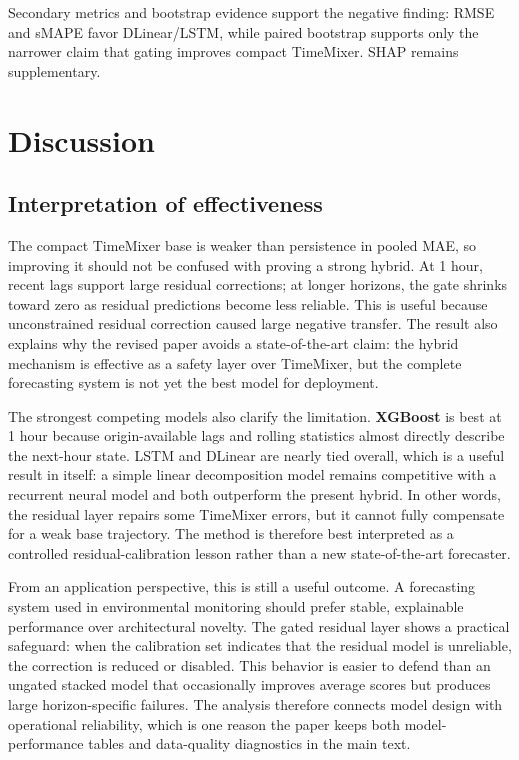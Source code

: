 \documentclass[sn-mathphys-num]{sn-jnl}
\begin{document}
Secondary metrics and bootstrap evidence support the negative finding: RMSE
and sMAPE favor DLinear/LSTM, while paired bootstrap supports only the narrower
claim that gating improves compact TimeMixer. SHAP remains supplementary.
\FloatBarrier

\section{Discussion}
\label{sec:discussion}



\subsection{Interpretation of effectiveness}
\label{sec:discussion-interpretation}

The compact TimeMixer base is weaker than persistence in pooled MAE, so
improving it should not be confused with proving a strong hybrid. At 1 hour,
recent lags support large residual corrections; at longer horizons, the gate
shrinks toward zero as residual predictions become less reliable. This is
useful because unconstrained residual correction caused large negative transfer.
The result also explains why the revised paper avoids a state-of-the-art claim:
the hybrid mechanism is effective as a safety layer over TimeMixer, but the
complete forecasting system is not yet the best model for deployment.

The strongest competing models also clarify the limitation. \textbf{XGBoost}
is best at 1 hour because origin-available lags and rolling statistics almost
directly describe the next-hour state. LSTM and DLinear are nearly tied overall,
which is a useful result in itself: a simple linear decomposition model remains
competitive with a recurrent neural model and both outperform the present
hybrid. In other words, the residual layer repairs some TimeMixer errors, but
it cannot fully compensate for a weak base trajectory. The method is therefore
best interpreted as a controlled residual-calibration lesson rather than a new
state-of-the-art forecaster.

From an application perspective, this is still a useful outcome. A forecasting
system used in environmental monitoring should prefer stable, explainable
performance over architectural novelty. The gated residual layer shows a
practical safeguard: when the calibration set indicates that the residual model
is unreliable, the correction is reduced or disabled. This behavior is easier
to defend than an ungated stacked model that occasionally improves average
scores but produces large horizon-specific failures. The analysis therefore
connects model design with operational reliability, which is one reason the
paper keeps both model-performance tables and data-quality diagnostics in the
main text.
\end{document}
